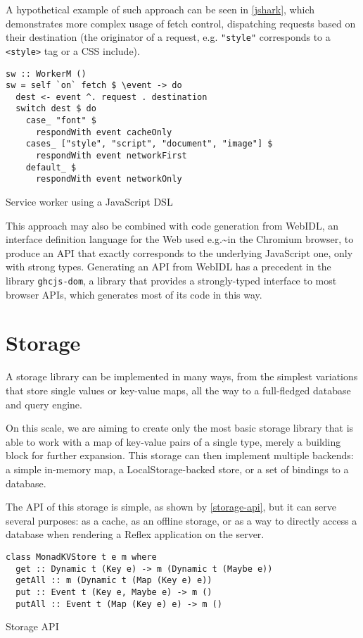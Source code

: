 \documentclass[english,odsaz]{fitthesis}
\begin{document}
A hypothetical example of such approach can be seen in
\ref{jshark}, which demonstrates more complex usage of fetch control, dispatching
requests based on their destination (the originator of a request, e.g. \texttt{"style"}
corresponds to a \texttt{<style>} tag or a CSS include).

\begin{listing}[htbp]
\begin{verbatim}
sw :: WorkerM ()
sw = self `on` fetch $ \event -> do
  dest <- event ^. request . destination
  switch dest $ do
    case_ "font" $
      respondWith event cacheOnly
    cases_ ["style", "script", "document", "image"] $
      respondWith event networkFirst
    default_ $
      respondWith event networkOnly
\end{verbatim}
\caption{Service worker using a JavaScript DSL \label{jshark}}
\end{listing}

This approach may also be combined with code generation from WebIDL, an
interface definition language for the Web \cite{webidl} used e.g.\textasciitilde{}in the Chromium
browser, to produce an API that exactly corresponds to the underlying JavaScript
one, only with strong types. Generating an API from WebIDL has a precedent in
the library \texttt{ghcjs-dom}, a library that provides a strongly-typed interface to
most browser APIs, which generates most of its code in this way.
\section{Storage}
\label{sec:orgf6883e4}
A storage library can be implemented in many ways, from the simplest variations
that store single values or key-value maps, all the way to a full-fledged
database and query engine.

On this scale, we are aiming to create only the most basic storage library that
is able to work with a map of key-value pairs of a single type, merely a
building block for further expansion. This storage can then implement multiple
backends: a simple in-memory map, a LocalStorage-backed store, or a set of
bindings to a database.

The API of this storage is simple, as shown by \ref{storage-api}, but it can serve
several purposes: as a cache, as an offline storage, or as a way to directly
access a database when rendering a Reflex application on the server.

\begin{listing}[htbp]
\begin{verbatim}
class MonadKVStore t e m where
  get :: Dynamic t (Key e) -> m (Dynamic t (Maybe e))
  getAll :: m (Dynamic t (Map (Key e) e))
  put :: Event t (Key e, Maybe e) -> m ()
  putAll :: Event t (Map (Key e) e) -> m ()
\end{verbatim}
\caption{Storage API \label{storage-api}}
\end{listing}
\end{document}
